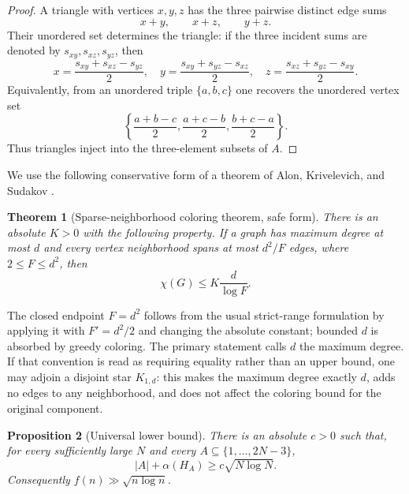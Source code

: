 \documentclass[11pt]{article}
\numberwithin{equation}{section}
\newtheorem{theorem}{Theorem}[section]
\newtheorem{proposition}[theorem]{Proposition}
\theoremstyle{definition}
\theoremstyle{remark}
\begin{document}
\begin{proof}
A triangle with vertices $x,y,z$ has the three pairwise distinct edge
sums
\[
 x+y,\qquad x+z,\qquad y+z.
\]
Their unordered set determines the triangle: if the three incident sums
are denoted by $s_{xy},s_{xz},s_{yz}$, then
\[
 x=\frac{s_{xy}+s_{xz}-s_{yz}}2,
 \quad
 y=\frac{s_{xy}+s_{yz}-s_{xz}}2,
 \quad
 z=\frac{s_{xz}+s_{yz}-s_{xy}}2.
\]
Equivalently, from an unordered triple $\{a,b,c\}$ one recovers the
unordered vertex set
\[
 \left\{\frac{a+b-c}{2},\frac{a+c-b}{2},\frac{b+c-a}{2}\right\}.
\]
Thus triangles inject into the three-element subsets of $A$.
\end{proof}

We use the following conservative form of a theorem of Alon,
Krivelevich, and Sudakov
\cite[Theorem~1.1]{AKS1999}.

\begin{theorem}[Sparse-neighborhood coloring theorem, safe form]\label{thm:aks}
There is an absolute $K>0$ with the following property.  If a graph has
maximum degree at most $d$ and every vertex neighborhood spans at most
$d^2/F$ edges, where $2\le F\le d^2$, then
\[
 \chi(G)\le K\frac d{\log F}.
\]
\end{theorem}

The closed endpoint $F=d^2$ follows from the usual strict-range formulation
by applying it with $F'=d^2/2$ and changing the absolute constant; bounded
$d$ is absorbed by greedy coloring.
The primary statement calls $d$ the maximum degree.  If that convention
is read as requiring equality rather than an upper bound, one may adjoin
a disjoint star $K_{1,d}$: this makes the maximum degree exactly $d$,
adds no edges to any neighborhood, and does not affect the coloring bound
for the original component.

\begin{proposition}[Universal lower bound]\label{prop:loglower}
There is an absolute $c>0$ such that, for every sufficiently large $N$
and every $A\subseteq\{1,\ldots,2N-3\}$,
\[
 |A|+\alpha(H_A)\ge c\sqrt{N\log N}.
\]
Consequently $f(n)\gg\sqrt{n\log n}$.
\end{proposition}
\end{document}
